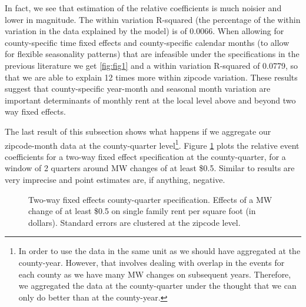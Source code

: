 In fact, we see that estimation of the relative coefficients is much noisier and lower in magnitude. The within variation R-squared (the percentage of the within variation in the data explained by the model) is of 0.0066. When allowing for county-specific time fixed effects and county-specific calendar months (to allow for flexible seasonality patterns) that are infeasible under the specifications in the previous literature we get \ref{fig:fig1} and a within variation R-squared of 0.0779, so that we are able to explain 12 times more within zipcode variation. These results suggest that county-specific year-month and seasonal month variation are important determinants of monthly rent at the local level above and beyond two way fixed effects.

The last result of this subsection shows what happens if we aggregate our zipcode-month data at the county-quarter level\footnote{In order to use the data in the same unit as \textcite{tidemann2018mw,yamagishi2019minimum} we should have aggregated at the county-year. However, that involves dealing with overlap in the events for each county as we have many MW changes on subsequent years. Therefore, we aggregated the data at the county-quarter under the thought that we can only do better than at the county-year. }. Figure \ref{fig:fig3} plots the relative event coefficients for a two-way fixed effect specification at the county-quarter, for a window of 2 quarters around MW changes of at least \$0.5. Similar to \textcite{tidemann2018mw} results are very imprecise and point estimates are, if anything, negative. 

\begin{figure}[h!]
    \centering
    \caption{Two-way fixed effects county-quarter specification. Effects of a MW change of at least \$0.5 on single family rent per square foot (in dollars). Standard errors are clustered at the zipcode level.}
    \label{fig:fig3}
\end{figure}

